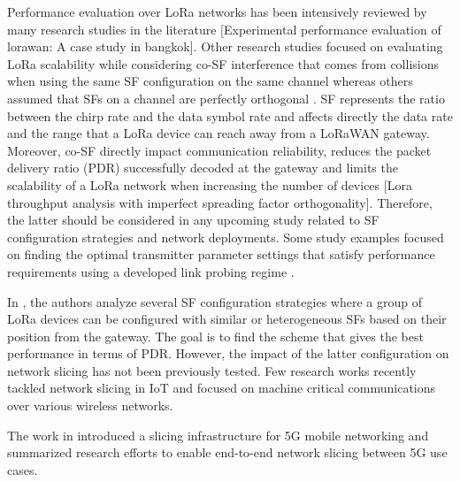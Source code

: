 Performance evaluation over LoRa networks has been intensively reviewed by many research studies in the literature \cite{wixted_evaluation_2016} \cite{li_application_2017} [Experimental performance evaluation of lorawan:
	A case study in bangkok].
Other research studies focused on evaluating LoRa scalability \cite{mikhaylov_lorawan_2017} while considering co-SF interference that comes from collisions when using the same SF configuration on the same channel \cite{georgiou_low_2017} whereas others assumed that SFs on a channel are perfectly orthogonal \cite{bor_lora_2016} \cite{bor_lora_nodate}.
SF represents the ratio between the chirp rate and the data symbol rate and affects directly the data rate and the range that a LoRa device can reach away from a LoRaWAN gateway.
Moreover,
	co-SF directly impact communication reliability,
	reduces the packet delivery ratio (PDR) successfully decoded at the gateway \cite{piva_impact_2017} and limits the scalability of a LoRa network when increasing the number of devices [Lora throughput analysis with imperfect spreading factor orthogonality].
Therefore,
	the latter should be considered in any upcoming study related to SF configuration strategies and network deployments.
Some study examples focused on finding the optimal transmitter parameter settings that satisfy performance requirements using a developed link probing regime \cite{bor_lora_2017}.

In \cite{lim_spreading_2018},
	the authors analyze several SF configuration strategies where a group of LoRa devices can be configured with similar or heterogeneous SFs based on their position from the gateway.
The goal is to find the scheme that gives the best performance in terms of PDR.
However,
	the impact of the latter configuration on network slicing has not been previously tested.
Few research works recently tackled network slicing in IoT and focused on machine critical communications over various wireless networks.

The work in \cite{nakao_end--end_2017} introduced a slicing infrastructure for 5G mobile networking and summarized research efforts to enable end-to-end network slicing between 5G use cases.


